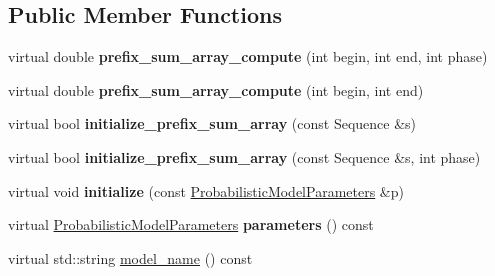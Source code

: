 \subsection*{Public Member Functions}
\begin{DoxyCompactItemize}
\item 
\mbox{\label{classtops_1_1SimilarityBasedSequenceWeighting_a5c31a8f807215abc296355e8401d8deb}} 
virtual double {\bfseries prefix\+\_\+sum\+\_\+array\+\_\+compute} (int begin, int end, int phase)
\item 
\mbox{\label{classtops_1_1SimilarityBasedSequenceWeighting_a4a47b49ff90c6703ed67ea3268d0e3b8}} 
virtual double {\bfseries prefix\+\_\+sum\+\_\+array\+\_\+compute} (int begin, int end)
\item 
\mbox{\label{classtops_1_1SimilarityBasedSequenceWeighting_af98eb88fbec43d3523475b8f895d161b}} 
virtual bool {\bfseries initialize\+\_\+prefix\+\_\+sum\+\_\+array} (const Sequence \&s)
\item 
\mbox{\label{classtops_1_1SimilarityBasedSequenceWeighting_a8e1009a78924462577809390f660da2f}} 
virtual bool {\bfseries initialize\+\_\+prefix\+\_\+sum\+\_\+array} (const Sequence \&s, int phase)
\item 
\mbox{\label{classtops_1_1SimilarityBasedSequenceWeighting_ae27369e6d62382cd774ae19f9cfb4cbf}} 
virtual void {\bfseries initialize} (const \hyperlink{classtops_1_1ProbabilisticModelParameters}{Probabilistic\+Model\+Parameters} \&p)
\item 
\mbox{\label{classtops_1_1SimilarityBasedSequenceWeighting_aa9e76219d638c927dfb6deed0d5394b3}} 
virtual \hyperlink{classtops_1_1ProbabilisticModelParameters}{Probabilistic\+Model\+Parameters} {\bfseries parameters} () const
\item 
\mbox{\label{classtops_1_1SimilarityBasedSequenceWeighting_affded2abc22cabba759138230ebcd3ee}} 
virtual std\+::string \hyperlink{classtops_1_1SimilarityBasedSequenceWeighting_affded2abc22cabba759138230ebcd3ee}{model\+\_\+name} () const

\end{DoxyCompactItemize}
